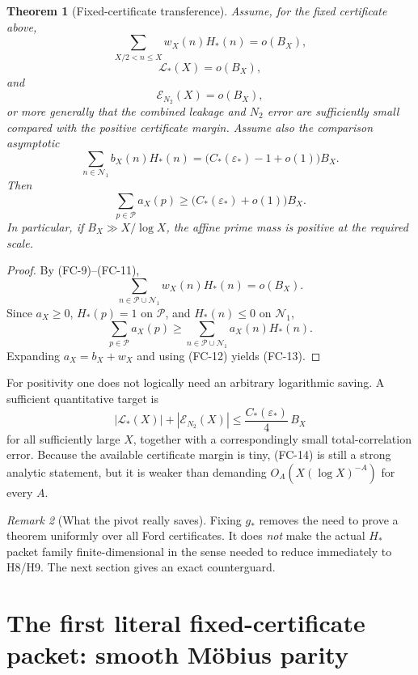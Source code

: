 \documentclass[11pt]{article}
\newtheorem{theorem}{Theorem}[section]
\theoremstyle{definition}
\theoremstyle{remark}
\newtheorem{remark}[theorem]{Remark}
\newcommand{\1}{\mathbf 1}
\begin{document}
\begin{theorem}[Fixed-certificate transference]\label{thm:fixed-cert-transfer}
Assume, for the fixed certificate above,
\[
 \sum_{X/2<n\le X}w_X(n)H_*(n)=o(B_X),
 \tag{FC-9}
\]
\[
 \mathcal L_*(X)=o(B_X),
 \tag{FC-10}
\]
and
\[
 \mathcal E_{N_2}(X)=o(B_X),
 \tag{FC-11}
\]
or more generally that the combined leakage and $N_2$ error are sufficiently small compared with the
positive certificate margin.  Assume also the comparison asymptotic
\[
 \sum_{n\in\mathcal N_1}b_X(n)H_*(n)
 =
 \bigl(C_*(\varepsilon_*)-1+o(1)\bigr)B_X.
 \tag{FC-12}
\]
Then
\[
 \boxed{
 \sum_{p\in\mathcal P}a_X(p)
 \ge
 \bigl(C_*(\varepsilon_*)+o(1)\bigr)B_X.}
 \tag{FC-13}
\]
In particular, if $B_X\gg X/\log X$, the affine prime mass is positive at the required scale.
\end{theorem}

\begin{proof}
By (FC-9)--(FC-11),
\[
 \sum_{n\in\mathcal P\cup\mathcal N_1}w_X(n)H_*(n)=o(B_X).
\]
Since $a_X\ge0$, $H_*(p)=1$ on $\mathcal P$, and $H_*(n)\le0$ on $\mathcal N_1$,
\[
 \sum_{p\in\mathcal P}a_X(p)
 \ge
 \sum_{n\in\mathcal P\cup\mathcal N_1}a_X(n)H_*(n).
\]
Expanding $a_X=b_X+w_X$ and using (FC-12) yields (FC-13).
\end{proof}

For positivity one does not logically need an arbitrary logarithmic saving.  A sufficient quantitative target is
\[
 \boxed{
 |\mathcal L_*(X)|+|\mathcal E_{N_2}(X)|
 \le
 \frac{C_*(\varepsilon_*)}{4}\,B_X
 }
 \tag{FC-14}
\]
for all sufficiently large $X$, together with a correspondingly small total-correlation error.  Because the
available certificate margin is tiny, (FC-14) is still a strong analytic statement, but it is weaker than
demanding $O_A(X(\log X)^{-A})$ for every $A$.

\begin{remark}[What the pivot really saves]
Fixing $g_*$ removes the need to prove a theorem uniformly over all Ford certificates.  It does \emph{not}
make the actual $H_*$ packet family finite-dimensional in the sense needed to reduce immediately to H8/H9.
The next section gives an exact counterguard.
\end{remark}

\section{The first literal fixed-certificate packet: smooth M\"obius parity}
\label{sec:smooth-parity}
\end{document}
